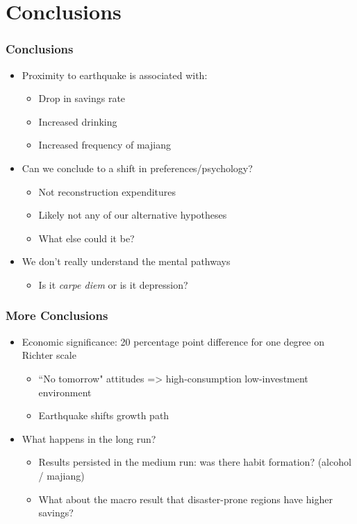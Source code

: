 \documentclass[aspectratio=169]{beamer}
\begin{document}
\section*{Conclusions}
\begin{frame}
    \frametitle{Conclusions}
    \begin{itemize}
        \item Proximity to earthquake is associated with:
        \begin{itemize}
           	\item Drop in savings rate 
           	\item Increased drinking
           	\item Increased frequency of majiang
        \end{itemize}
        \item<2-> Can we conclude to a shift in preferences/psychology? 
        \begin{itemize}
           	\item Not reconstruction expenditures  
           	\item Likely not any of our alternative hypotheses
           	\item What else could it be?
        \end{itemize}
       	\item<3-> We don't really understand the mental pathways 
        \begin{itemize}
            \item Is it \textit{carpe diem} or is it depression?  
        \end{itemize}
    \end{itemize}
\end{frame}

\begin{frame}
	\frametitle{More Conclusions}
	\begin{itemize}
		\item Economic significance: 20 percentage point difference for one degree on Richter scale
		\begin{itemize}
			\item ``No tomorrow" attitudes => high-consumption low-investment environment
			\item Earthquake shifts growth path
		\end{itemize}
		\item <2->What happens in the long run? 
		\begin{itemize}
			\item Results persisted in the medium run: was there habit formation? (alcohol / majiang)
			\item What about the macro result that disaster-prone regions have higher savings? 
		\end{itemize}
\end{itemize}
\end{frame}
\end{document}
